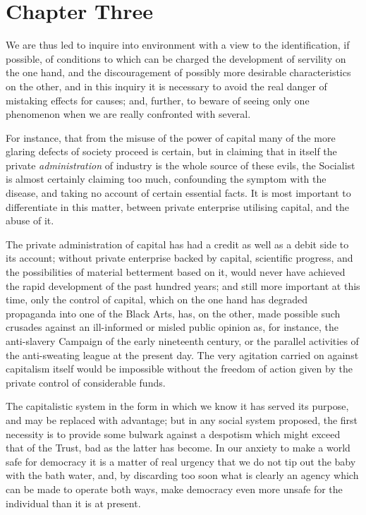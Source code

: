 \documentclass{book}
\begin{document}
\chapter{Chapter Three}
\label{chapter-3}
We are thus led to inquire into environment with a view to the identification, if possible, of conditions to which can be charged the development of servility on the one hand, and the discouragement of possibly more desirable characteristics on the other, and in this inquiry it is necessary to avoid the real danger of mistaking effects for causes; and, further, to beware of seeing only one phenomenon when we are really confronted with several.

For instance, that from the misuse of the power of capital many of the more glaring defects of society proceed is certain, but in claiming that in itself the private \emph{administration} of industry is the whole source of these evils, the Socialist is almost certainly claiming too much, confounding the symptom with the disease, and taking no account of certain essential facts. It is most important to differentiate in this matter, between private enterprise utilising capital, and the abuse of it.

The private administration of capital has had a credit as well as a debit side to its account; without private enterprise backed by capital, scientific progress, and the possibilities of material betterment based on it, would never have achieved the rapid development of the past hundred years; and still more important at this time, only the control of capital, which on the one hand has degraded propaganda into one of the Black Arts, has, on the other, made possible such crusades against an ill-informed or misled public opinion as, for instance, the anti-slavery Campaign of the early nineteenth century, or the parallel activities of the anti-sweating league at the present day. The very agitation carried on against capitalism itself would be impossible without the freedom of action given by the private control of considerable funds.

The capitalistic system in the form in which we know it has served its purpose, and may be replaced with advantage; but in any social system proposed, the first necessity is to provide some bulwark against a despotism which might exceed that of the Trust, bad as the latter has become. In our anxiety to make a world safe for democracy it is a matter of real urgency that we do not tip out the baby with the bath water, and, by discarding too soon what is clearly an agency which can be made to operate both ways, make democracy even more unsafe for the individual than it is at present.
\end{document}
